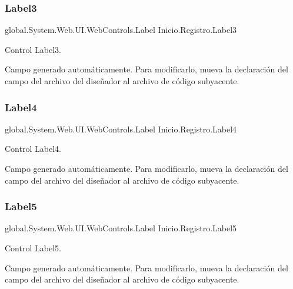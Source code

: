 \subsubsection{\texorpdfstring{Label3}{Label3}}
{\footnotesize\ttfamily global.\+System.\+Web.\+U\+I.\+Web\+Controls.\+Label Inicio.\+Registro.\+Label3\hspace{0.3cm}{\ttfamily [protected]}}



Control Label3. 

Campo generado automáticamente. Para modificarlo, mueva la declaración del campo del archivo del diseñador al archivo de código subyacente. \mbox{\label{classInicio_1_1Registro_a0cb8176c99e6ad87d5f77896e1aaf5d1}} 
\subsubsection{\texorpdfstring{Label4}{Label4}}
{\footnotesize\ttfamily global.\+System.\+Web.\+U\+I.\+Web\+Controls.\+Label Inicio.\+Registro.\+Label4\hspace{0.3cm}{\ttfamily [protected]}}



Control Label4. 

Campo generado automáticamente. Para modificarlo, mueva la declaración del campo del archivo del diseñador al archivo de código subyacente. \mbox{\label{classInicio_1_1Registro_abe5ff1ad9dfeb25a9e673175b1aa828f}} 
\subsubsection{\texorpdfstring{Label5}{Label5}}
{\footnotesize\ttfamily global.\+System.\+Web.\+U\+I.\+Web\+Controls.\+Label Inicio.\+Registro.\+Label5\hspace{0.3cm}{\ttfamily [protected]}}



Control Label5. 

Campo generado automáticamente. Para modificarlo, mueva la declaración del campo del archivo del diseñador al archivo de código subyacente. \mbox{\label{classInicio_1_1Registro_a1f4d81dd35af2a53cf1df120b4f9b383}} 
